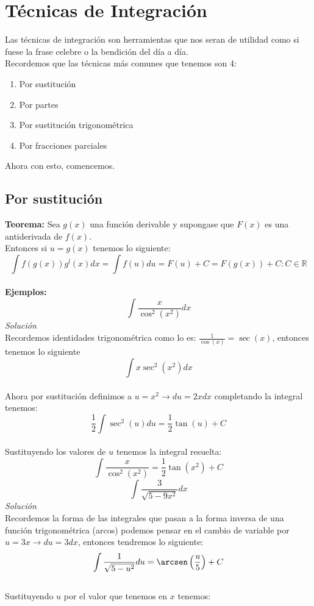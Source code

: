 \documentclass[10pt,executivepaper]{article}
\begin{document}
\section{Técnicas de Integración}
Las técnicas de integración son herramientas que nos seran de utilidad como si fuese la frase celebre o la bendición del día a día.\\
Recordemos que las técnicas más comunes que tenemos son 4:
\begin{enumerate}
  \item Por sustitución
  \item Por partes
  \item Por sustitución trigonométrica
  \item Por fracciones parciales
\end{enumerate}
Ahora con esto, comencemos.
\subsection{Por sustitución}
\textbf{Teorema:} Sea $g(x)$ una función derivable y supongase que $F(x)$ es una antiderivada de $f(x)$.\\
Entonces si $u=g(x)$ tenemos lo siguiente:\\
\[\int f(g(x))g^{l}(x)dx = \int f(u)du = F(u) + C = F(g(x)) + C   \colon C \in \mathbb{R}\]
\\
\textbf{Ejemplos:}
\\
\[\int \frac{x}{\cos^{2}(x^{2})}dx\]
\textit{Solución}\\
Recordemos identidades trigonométrica como lo es: $\frac{1}{\cos(x)}=\sec(x)$, entonces tenemos lo siguiente
\[\int x \sec^{2}(x^2)dx\]\\
Ahora por sustitución definimos a $u=x^{2} \rightarrow du=2x dx$ completando la integral tenemos:
\[\frac{1}{2}\int \sec^{2}(u)du = \frac{1}{2}\tan(u) + C\]\\
Sustituyendo los valores de $u$ tenemos la integral resuelta:
\[\int \frac{x}{\cos^{2}(x^{2})} = \frac{1}{2} \tan(x^{2}) + C \]
\vspace{1.5cm}
\[\int \frac{3}{\sqrt{5-9x^{2}}}dx\]
\textit{Solución}\\
Recordemos la forma de las integrales que pasan a la forma inversa de una función trigonométrica (arcos) podemos pensar en el cambio de variable por $u=3x \rightarrow du=3dx$, entonces tendremos lo siguiente:\\
\[\int \frac{1}{\sqrt{5-u^{2}}}du = \arcsen\left(\frac{u}{5}\right) + C\]\\
Sustituyendo $u$ por el valor que tenemos en $x$ tenemos:\\
\end{document}
